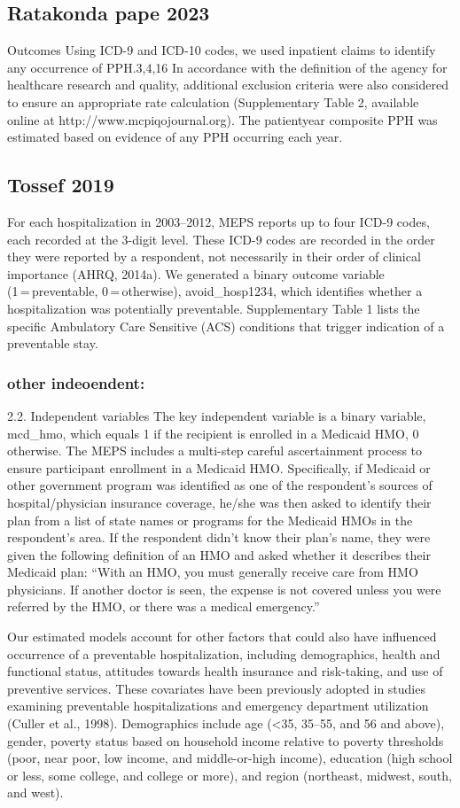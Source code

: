 \documentclass[../main.tex]{subfiles}
\begin{document}
\subsection{Ratakonda pape 2023}
Outcomes Using ICD-9 and ICD-10 codes, we used inpatient claims to identify any occurrence of PPH.3,4,16 In accordance with the definition of the agency for healthcare research and quality, additional exclusion criteria were also considered to ensure an appropriate rate calculation (Supplementary Table 2, available online at http://www.mcpiqojournal.org). The patientyear composite PPH was estimated based on evidence of any PPH occurring each year.

\subsection{Tossef 2019}
For each hospitalization in 2003–2012, MEPS reports up to four ICD-9 codes, each recorded at the 3-digit level. These ICD-9 codes are recorded in the order they were reported by a respondent, not necessarily in their order of clinical importance (AHRQ, 2014a). We generated a binary outcome variable (1 = preventable, 0 = otherwise), avoid_hosp1234, which identifies whether a hospitalization was potentially preventable. Supplementary Table 1 lists the specific Ambulatory Care Sensitive (ACS) conditions that trigger indication of a preventable stay.
\subsubsection{other indeoendent:}
2.2. Independent variables
The key independent variable is a binary variable, mcd_hmo, which equals 1 if the recipient is enrolled in a Medicaid HMO, 0 otherwise. The MEPS includes a multi-step careful ascertainment process to ensure participant enrollment in a Medicaid HMO. Specifically, if Medicaid or other government program was identified as one of the respondent's sources of hospital/physician insurance coverage, he/she was then asked to identify their plan from a list of state names or programs for the Medicaid HMOs in the respondent's area. If the respondent didn't know their plan's name, they were given the following definition of an HMO and asked whether it describes their Medicaid plan: “With an HMO, you must generally receive care from HMO physicians. If another doctor is seen, the expense is not covered unless you were referred by the HMO, or there was a medical emergency.”

Our estimated models account for other factors that could also have influenced occurrence of a preventable hospitalization, including demographics, health and functional status, attitudes towards health insurance and risk-taking, and use of preventive services. These covariates have been previously adopted in studies examining preventable hospitalizations and emergency department utilization (Culler et al., 1998). Demographics include age (<35, 35–55, and 56 and above), gender, poverty status based on household income relative to poverty thresholds (poor, near poor, low income, and middle-or-high income), education (high school or less, some college, and college or more), and region (northeast, midwest, south, and west).
\end{document}

